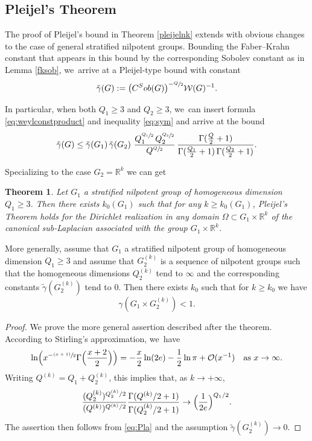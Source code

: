 \documentclass[11pt]{article}
\let\oldsfrac\sfrac
\renewcommand{\sfrac}[2]{{\oldsfrac{#1}{#2}}}
\newcommand{\psfrac}[2]{{\sfrac{(#1)}{#2}}}
\newcommand{\Sob}{\textup{Sob}}
\newtheorem{theorem}{Theorem}[section]
\theoremstyle{definition}
\newcommand{\1}{\mathbbm{1}}
\newcommand{\R}{\mathbb{R}}
\numberwithin{equation}{section}
\begin{document}
\subsection{Pleijel's Theorem}
The proof of Pleijel's bound in Theorem \ref{pleijelnk} extends with obvious changes to the case of general stratified nilpotent groups. Bounding the Faber--Krahn constant that appears in this bound by the corresponding Sobolev constant as in Lemma \ref{fksob}, we~arrive at a Pleijel-type bound with constant
\[
\tilde\gamma (G) := \bigl(C^\Sob(G)\bigr)^{-\sfrac{Q}{2}}\mathcal W(G)^{-1}.
\]

In particular, when both $Q_1\geq 3$ and $Q_2\geq 3$, we~can insert formula \eqref{eq:weylconstproduct} and inequality \eqref{eq:sym} and arrive at the bound
\begin{align}\label{eq:Pla}
\tilde\gamma (G) \leq \tilde\gamma (G_1) \,\tilde\gamma (G_2) \ \frac{Q_1^{\sfrac{Q_1}2}\,Q_2^{\sfrac{Q_2}2}}{Q^{\sfrac Q2}} \,
\frac{\Gamma (\frac Q2+1)}{\Gamma(\frac{Q_1}2 +1) \,\Gamma(\frac{Q_2}2 +1)}.
\end{align}

Specializing to the case $G_2=\R^k$ we can get

\begin{theorem}
Let $G_1$ a stratified nilpotent group of homogeneous dimension \hbox{$Q_1\geq3$}. Then there exists $k_0(G_1)$ such that for any $k\geq k_0(G_1)$, Pleijel's Theorem holds for the Dirichlet realization in any domain $\Omega\subset G_1\times\R^k$ of the canonical sub-Laplacian associated with the group $G_1 \times \mathbb R^k$.
\end{theorem}

More generally, assume that $G_1$ a stratified nilpotent group of homogeneous dimension $Q_1\geq 3$ and assume that $G_2^{(k)}$ is a sequence of nilpotent groups such that the homogeneous dimensions $Q_2^{(k)}$ tend to $\infty$ and the corresponding constants $\tilde\gamma(G_2^{(k)})$ tend to $0$. Then there exists $k_0$ such that for $k\geq k_0$ we have
\[
\gamma(G_1 \times G_2^{(k)}) <1.
\]

\begin{proof}
We prove the more general assertion described after the theorem. According to Stirling's approximation, we~have
\begin{equation}\label{eq:Stir}
\ln \Bigl(x^{-\psfrac{x+1}2} \Gamma\Bigl(\frac{x+2}2\Bigr) \Bigr) = - \frac x2 \ln(2e) - \frac12 \ln \pi + \mathcal O(x^{-1})
\quad\text{as}\ x\to\infty.
\end{equation}
Writing $Q^{(k)} = Q_1 + Q_2^{(k)}$, this implies that, as $k\to +\infty$,
\[
\frac{(Q_2^{(k)})^{Q_2^{(k)}/2}}{(Q^{(k)})^{Q^{(k)}/2}} \frac{\Gamma (Q^{(k)}/2+1)}{\Gamma(Q_2^{(k)}/2 +1)}\to \Bigl(\frac{1}{2e}\Bigr)^{Q_1/2}.
\]
The assertion then follows from \eqref{eq:Pla} and the assumption $\tilde\gamma(G_2^{(k)})\to 0$.
\end{proof}
\end{document}
